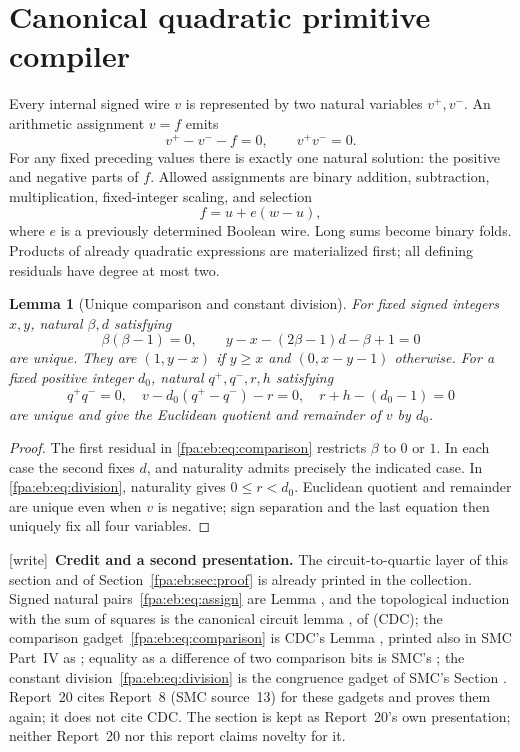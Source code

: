 \documentclass[11pt,a4paper]{article}
\numberwithin{equation}{section}
\newtheorem{lemma}[theorem]{Lemma}
\newcommand{\wtag}{\textup{[write]}}
\begin{document}
\section{Canonical quadratic primitive compiler}\label{fpa:eb:sec:primitive}
Every internal signed wire $v$ is represented by two natural variables $v^+,v^-$. An arithmetic assignment $v=f$ emits
\begin{equation}\label{fpa:eb:eq:assign}
v^+-v^--f=0,\qquad v^+v^-=0.
\end{equation}
For any fixed preceding values there is exactly one natural solution: the positive and negative parts of $f$. Allowed assignments are binary addition, subtraction, multiplication, fixed-integer scaling, and selection
\[
f=u+e(w-u),
\]
where $e$ is a previously determined Boolean wire. Long sums become binary folds. Products of already quadratic expressions are materialized first; all defining residuals have degree at most two.

\begin{lemma}[Unique comparison and constant division]\label{fpa:eb:lem:primitives}
For fixed signed integers $x,y$, natural $\beta,d$ satisfying
\begin{equation}\label{fpa:eb:eq:comparison}
\beta(\beta-1)=0,\qquad y-x-(2\beta-1)d-\beta+1=0
\end{equation}
are unique. They are $(1,y-x)$ if $y\geq x$ and $(0,x-y-1)$ otherwise. For a fixed positive integer $d_0$, natural $q^+,q^-,r,h$ satisfying
\begin{equation}\label{fpa:eb:eq:division}
q^+q^-=0,\quad v-d_0(q^+-q^-)-r=0,\quad r+h-(d_0-1)=0
\end{equation}
are unique and give the Euclidean quotient and remainder of $v$ by $d_0$.
\end{lemma}
\begin{proof}
The first residual in \eqref{fpa:eb:eq:comparison} restricts $\beta$ to $0$ or $1$. In each case the second fixes $d$, and naturality admits precisely the indicated case. In \eqref{fpa:eb:eq:division}, naturality gives $0\leq r<d_0$. Euclidean quotient and remainder are unique even when $v$ is negative; sign separation and the last equation then uniquely fix all four variables.
\end{proof}
\wtag\ \textbf{Credit and a second presentation.} The circuit-to-quartic layer of this section and of Section~\ref{fpa:eb:sec:proof} is already printed in the collection. Signed natural pairs~\eqref{fpa:eb:eq:assign} are Lemma , and the topological induction with the sum of squares is the canonical circuit lemma , of  (CDC); the comparison gadget~\eqref{fpa:eb:eq:comparison} is CDC's Lemma , printed also in SMC Part~IV as ; equality as a difference of two comparison bits is SMC's ; the constant division~\eqref{fpa:eb:eq:division} is the congruence gadget of SMC's Section . Report~20 cites Report~8 (SMC source~13) for these gadgets and proves them again; it does not cite CDC. The section is kept as Report~20's own presentation; neither Report~20 nor this report claims novelty for it.
\end{document}
